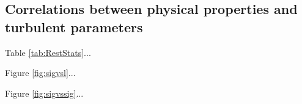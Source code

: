 \documentclass[fleqn,usenatbib, useAMS, a4paper]{mnras}
\begin{document}
\subsection{Correlations between physical properties and turbulent parameters}

Table \ref{tab:RestStats}...

Figure \ref{fig:sigvsl}...

Figure \ref{fig:sigvssig}...




\end{document}
